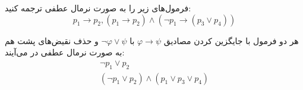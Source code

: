 فرمول‌های زیر را به صورت نرمال عطفی ترجمه کنید:
$$p_1\to p_2, (p_1\to p_2)\wedge (\neg p_1\to (p_3\vee p_4))$$
\vspace{-0.5cm}
\begin{ans}
    هر دو فرمول با جایگزین کردن مصادیق
    $\varphi\to\psi$
    با
    $\neg\varphi\vee\psi$
    و حذف نقیض‌های پشت هم به صورت نرمال عطفی در می‌آیند:
    \begin{gather*}
        \neg p_1\vee p_2 \\
        (\neg p_1\vee p_2)\wedge (p_1\vee p_3\vee p_4)
    \end{gather*}
\end{ans}
